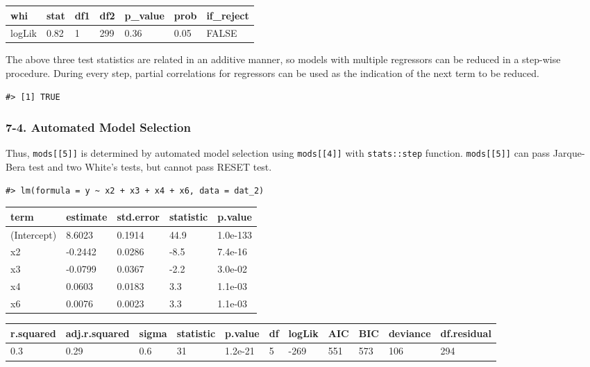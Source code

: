 \documentclass[a4paper]{article}
\begin{document}
\begin{table}[H]
\centering
\begin{tabular}{lllllll}
\toprule
whi & stat & df1 & df2 & p\_value & prob & if\_reject\\
\midrule
logLik & 0.82 & 1 & 299 & 0.36 & 0.05 & FALSE\\
\bottomrule
\end{tabular}
\end{table}

The above three test statistics are related in an additive manner, so
models with multiple regressors can be reduced in a step-wise procedure.
During every step, partial correlations for regressors can be used as
the indication of the next term to be reduced.

\begin{verbatim}
#> [1] TRUE
\end{verbatim}

\hypertarget{automated-model-selection}{%
\subsubsection{7-4. Automated Model
Selection}\label{automated-model-selection}}

Thus, \texttt{mods{[}{[}5{]}{]}} is determined by automated model
selection using \texttt{mods{[}{[}4{]}{]}} with \texttt{stats::step}
function. \texttt{mods{[}{[}5{]}{]}} can pass Jarque-Bera test and two
White's tests, but cannot pass RESET test.

\begin{verbatim}
#> lm(formula = y ~ x2 + x3 + x4 + x6, data = dat_2)
\end{verbatim}

\begin{table}[H]
\centering
\begin{tabular}{lllll}
\toprule
term & estimate & std.error & statistic & p.value\\
\midrule
(Intercept) & 8.6023 & 0.1914 & 44.9 & 1.0e-133\\
x2 & -0.2442 & 0.0286 & -8.5 & 7.4e-16\\
x3 & -0.0799 & 0.0367 & -2.2 & 3.0e-02\\
x4 & 0.0603 & 0.0183 & 3.3 & 1.1e-03\\
x6 & 0.0076 & 0.0023 & 3.3 & 1.1e-03\\
\bottomrule
\end{tabular}
\end{table}

\begin{table}[H]
\centering
\begin{tabular}{lllllllllll}
\toprule
r.squared & adj.r.squared & sigma & statistic & p.value & df & logLik & AIC & BIC & deviance & df.residual\\
\midrule
0.3 & 0.29 & 0.6 & 31 & 1.2e-21 & 5 & -269 & 551 & 573 & 106 & 294\\
\bottomrule
\end{tabular}
\end{table}
\end{document}
